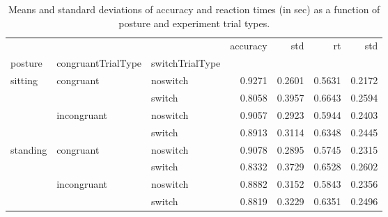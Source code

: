 \begin{table}
\centering
\caption{Means and standard deviations of accuracy and reaction times (in sec) as a function of posture and experiment trial types.}
\label{table-task-switching-replication-reaction-time}
\begin{tabular}{lllrrrr}
\toprule
         &             &        & accuracy &    std &     rt &    std \\
posture & congruantTrialType & switchTrialType &          &        &        &        \\
\midrule
sitting & congruant & noswitch &   0.9271 & 0.2601 & 0.5631 & 0.2172 \\
         &             & switch &   0.8058 & 0.3957 & 0.6643 & 0.2594 \\
         & incongruant & noswitch &   0.9057 & 0.2923 & 0.5944 & 0.2403 \\
         &             & switch &   0.8913 & 0.3114 & 0.6348 & 0.2445 \\
standing & congruant & noswitch &   0.9078 & 0.2895 & 0.5745 & 0.2315 \\
         &             & switch &   0.8332 & 0.3729 & 0.6528 & 0.2602 \\
         & incongruant & noswitch &   0.8882 & 0.3152 & 0.5843 & 0.2356 \\
         &             & switch &   0.8819 & 0.3229 & 0.6351 & 0.2496 \\
\bottomrule
\end{tabular}
\end{table}
